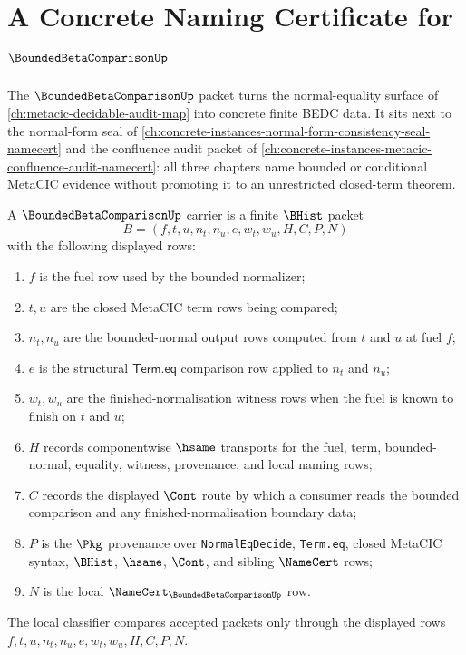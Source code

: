 \chapter{A Concrete Naming Certificate for $\BoundedBetaComparisonUp$}
\label{ch:concrete-instances-bounded-beta-comparison-namecert}

The $\BoundedBetaComparisonUp$ packet turns the normal-equality surface of
\autoref{ch:metacic-decidable-audit-map} into concrete finite BEDC data. It
sits next to the normal-form seal of
\autoref{ch:concrete-instances-normal-form-consistency-seal-namecert} and the
confluence audit packet of
\autoref{ch:concrete-instances-metacic-confluence-audit-namecert}: all three
chapters name bounded or conditional MetaCIC evidence without promoting it to
an unrestricted closed-term theorem.

\begin{definition}
\label{def:bounded-beta-comparison-carrier}
A $\BoundedBetaComparisonUp$ carrier is a finite $\BHist$ packet
$$
B=(f,t,u,n_t,n_u,e,w_t,w_u,H,C,P,N)
$$
with the following displayed rows:
\begin{enumerate}
\item $f$ is the fuel row used by the bounded normalizer;
\item $t,u$ are the closed MetaCIC term rows being compared;
\item $n_t,n_u$ are the bounded-normal output rows computed from $t$ and $u$
at fuel $f$;
\item $e$ is the structural $\mathsf{Term.eq}$ comparison row applied to
$n_t$ and $n_u$;
\item $w_t,w_u$ are the finished-normalisation witness rows when the fuel is
known to finish on $t$ and $u$;
\item $H$ records componentwise $\hsame$ transports for the fuel, term,
bounded-normal, equality, witness, provenance, and local naming rows;
\item $C$ records the displayed $\Cont$ route by which a consumer reads the
bounded comparison and any finished-normalisation boundary data;
\item $P$ is the $\Pkg$ provenance over \texttt{NormalEqDecide},
\texttt{Term.eq}, closed MetaCIC syntax, $\BHist$, $\hsame$, $\Cont$, and
sibling $\NameCert$ rows;
\item $N$ is the local $\NameCert_{\BoundedBetaComparisonUp}$ row.
\end{enumerate}
The local classifier compares accepted packets only through the displayed rows
$f,t,u,n_t,n_u,e,w_t,w_u,H,C,P,N$.
\end{definition}

